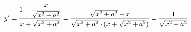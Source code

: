 \documentclass[preview]{standalone}
\begin{document}
\begin{align*}
\special{dvisvgm:raw <g id='unique000'>}y'=\dfrac{1+\dfrac{x}{\sqrt{x^2+a^2}}}{x+\sqrt{x^2+a^2}}=\dfrac{\sqrt{x^2+a^2}+x}{\sqrt{x^2+a^2}\cdot(x+\sqrt{x^2+a^2})}=\dfrac{1}{\sqrt{x^2+a^2}}\special{dvisvgm:raw </g>}
\end{align*}
\end{document}
